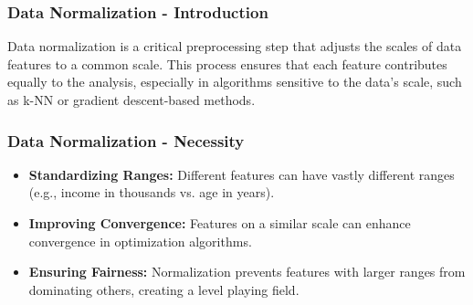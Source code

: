 \documentclass{beamer}
\begin{document}
\begin{frame}[fragile]
    \frametitle{Data Normalization - Introduction}
    Data normalization is a critical preprocessing step that adjusts the scales of data features to a common scale. 
    This process ensures that each feature contributes equally to the analysis, especially in algorithms sensitive to the data's scale, such as k-NN or gradient descent-based methods.

\end{frame}

\begin{frame}[fragile]
    \frametitle{Data Normalization - Necessity}
    \begin{itemize}
        \item \textbf{Standardizing Ranges:} Different features can have vastly different ranges (e.g., income in thousands vs. age in years).
        \item \textbf{Improving Convergence:} Features on a similar scale can enhance convergence in optimization algorithms.
        \item \textbf{Ensuring Fairness:} Normalization prevents features with larger ranges from dominating others, creating a level playing field.
    \end{itemize}
\end{frame}
\end{document}
